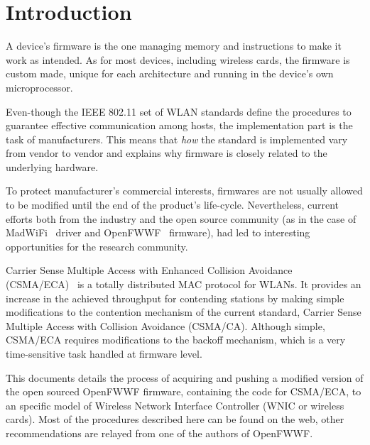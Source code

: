 \documentclass[conference]{IEEEtran}
\begin{document}

\section{Introduction}\label{introduction}
A device's firmware is the one managing memory and instructions to make it work as intended. As for most devices, including wireless cards, the firmware is custom made, unique for each architecture and running in the device's own microprocessor.

Even-though the IEEE 802.11 set of WLAN standards define the procedures to guarantee effective communication among hosts, the implementation part is the task of manufacturers. This means that \emph{how} the standard is implemented vary from vendor to vendor and explains why firmware is closely related to the underlying hardware.


To protect manufacturer's commercial interests, firmwares are not usually allowed to be modified until the end of the product's life-cycle. Nevertheless, current efforts both from the industry and the open source community (as in the case of MadWiFi~\cite{madWiFi} driver and OpenFWWF~\cite{OpenFWWF} firmware), had led to interesting opportunities for the research community.

Carrier Sense Multiple Access with Enhanced Collision Avoidance (CSMA/ECA)~\cite{barcelo2008lba} is a totally distributed MAC protocol for WLANs. It provides an increase in the achieved throughput for contending stations by making simple modifications to the contention mechanism of the current standard, Carrier Sense Multiple Access with Collision Avoidance (CSMA/CA). Although simple, CSMA/ECA requires modifications to the backoff mechanism, which is a very time-sensitive task handled at firmware level.

This documents details the process of acquiring and pushing a modified version of the open sourced OpenFWWF firmware, containing the code for CSMA/ECA, to an specific model of Wireless Network Interface Controller (WNIC or wireless cards). Most of the procedures described here can be found on the web, other recommendations are relayed from one of the authors of OpenFWWF.

\end{document}
